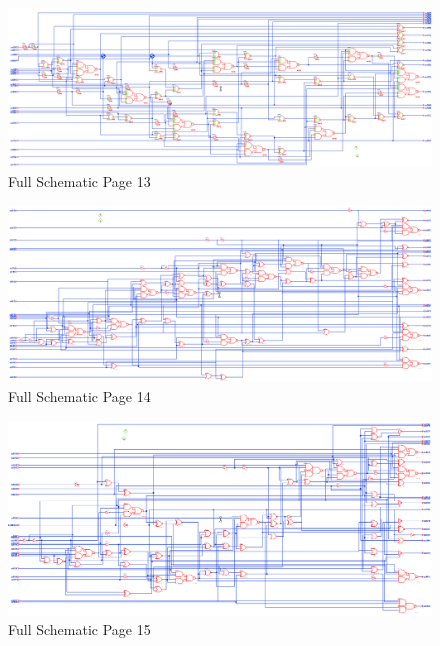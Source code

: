 \documentclass[11pt]{article}
\begin{document}
		
		\begin{figure}[H] 
			\centering 
			\includegraphics[width=\textwidth,height=\dimexpr\textheight-4\baselineskip-\abovecaptionskip-\belowcaptionskip\relax,keepaspectratio]{"Pictures/Full Schematic Page 13"}
			\caption{Full Schematic Page 13} 
			\label{fig:Full-Schematic-Page-13} 
		\end{figure}
		
		
		\begin{figure}[H] 
			\centering 
			\includegraphics[width=\textwidth,height=\dimexpr\textheight-4\baselineskip-\abovecaptionskip-\belowcaptionskip\relax,keepaspectratio]{"Pictures/Full Schematic Page 14"}
			\caption{Full Schematic Page 14} 
			\label{fig:Full-Schematic-Page-14} 
		\end{figure}
		
		
		\begin{figure}[H] 
			\centering 
			\includegraphics[width=\textwidth,height=\dimexpr\textheight-4\baselineskip-\abovecaptionskip-\belowcaptionskip\relax,keepaspectratio]{"Pictures/Full Schematic Page 15"}
			\caption{Full Schematic Page 15} 
			\label{fig:Full-Schematic-Page-15} 
		\end{figure}
		
\end{document}

